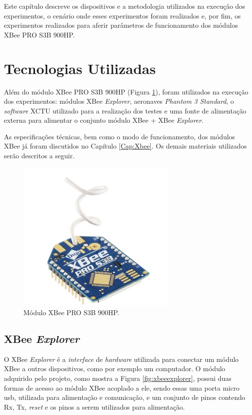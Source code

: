 \label{Cap:Procedimento}

Este capítulo descreve os dispositivos e a metodologia utilizados na execução dos experimentos, o cenário onde esses experimentos foram realizados e, por fim, os experimentos realizados para aferir parâmetros de funcionamento dos módulos XBee PRO S3B 900HP.

\section{Tecnologias Utilizadas}

Além do módulo XBee PRO S3B 900HP (Figura \ref{fig:xbeepro}), foram utilizados na execução dos experimentos: módulos XBee \emph{Explorer}, aeronaves \emph{Phantom 3 Standard}, o \emph{software} XCTU utilizado para a realização dos testes e uma fonte de alimentação externa para alimentar o conjunto módulo XBee + XBee \emph{Explorer}.

As especificações técnicas, bem como o modo de funcionamento, dos módulos XBee já foram discutidos no Capítulo \ref{Cap:Xbee}. Os demais materiais utilizados serão descritos a seguir.

\begin{figure}[h!] 
\center
\includegraphics[width=0.7\textwidth]{xbeepro.png}
\caption{Módulo XBee PRO S3B 900HP.} 
\label{fig:xbeepro}
\end{figure}

\subsection{XBee \emph{Explorer}}

O XBee \emph{Explorer} é a \emph{interface} de \emph{hardware} utilizada para conectar um módulo XBee a outros dispositivos, como por exemplo um computador. O módulo adquirido pelo projeto, como mostra a Figura \ref{fig:xbeeexplorer}, possui duas formas de acesso ao módulo XBee acoplado a ele, sendo essas uma porta micro usb, utilizada para alimentação e comunicação, e um conjunto de pinos contendo Rx, Tx, \emph{reset} e os pinos a serem utilizados para alimentação.

